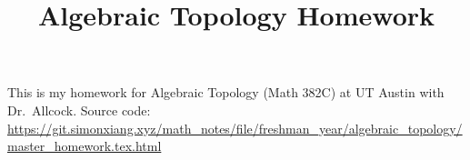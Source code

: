 \documentclass{scrartcl}
\title{Algebraic Topology Homework}
\date{}
\begin{document}
\maketitle
This is my homework for Algebraic Topology (Math 382C) at UT Austin with Dr.\ Allcock. Source code: \url{https://git.simonxiang.xyz/math_notes/file/freshman_year/algebraic_topology/master_homework.tex.html} 
\tableofcontents
    
\end{document}
